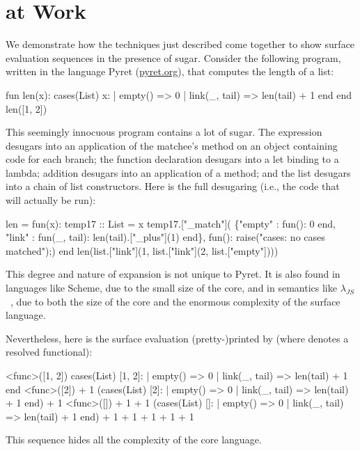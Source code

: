 \section{{\Resugarer} at Work}
\label{sec:reval-pyret-example}

We demonstrate how the techniques just described come together to show
surface evaluation sequences in the presence of sugar. Consider the
following program, written in the language Pyret (\url{pyret.org}), 
that computes the length of a list:
\begin{Codes}
    fun len(x):
      cases(List) x:
        | empty() => 0
        | link(_, tail) => len(tail) + 1
      end
    end
    len([1, 2])
\end{Codes}
This seemingly innocuous program contains a lot of sugar. The 
expression desugars into an application of the matchee's 
method on an object containing code for each branch; the function
declaration desugars into a let binding to a lambda; addition desugars
into an application of a  method; and the list \Code{[1, 2]}
desugars into a chain of list constructors. Here is the full desugaring
(i.e., the code that will actually be run):
\begin{Codes}
len = fun(x):
    temp17 :: List = x
    temp17.["_match"](
      \{"empty" : fun(): 0 end,
       "link" : fun(_, tail):
                len(tail).["_plus"](1) end\},
      fun(): raise("cases: no cases matched");)
    end
len(list.["link"](1, list.["link"](2, list.["empty"])))
\end{Codes}
This degree and nature of expansion is not unique to Pyret.
It is also found in languages like Scheme, due
to the small size of the core, and in semantics like
$\lambda_{JS}$~\cite{lambda-js},
due to both the size of the core and the enormous complexity
of the surface language.

Nevertheless, here is the surface evaluation (pretty-)printed by {\Resugarer} (where
 denotes a resolved functional):
\begin{Codes}
\SurfStep <func>([1, 2])
\SurfStep cases(List) [1, 2]:
      | empty() => 0
      | link(_, tail) => len(tail) + 1
    end
\SurfStep <func>([2]) + 1
\SurfStep (cases(List) [2]:
      | empty() => 0
      | link(_, tail) => len(tail) + 1
    end) + 1
\SurfStep <func>([]) + 1 + 1
\SurfStep (cases(List) []:
      | empty() => 0
      | link(_, tail) => len(tail) + 1
    end) + 1 + 1
 + 1 + 1
 + 1
\end{Codes}
This sequence hides all the complexity of the core language.

